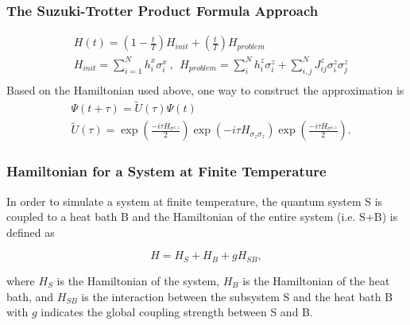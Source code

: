 \documentclass{beamer}
\begin{document}
\begin{frame}
	\frametitle{The Suzuki-Trotter Product Formula Approach}
	\begin{equation*}
		\begin{split}
		&H(t)=(1-\frac{t}{T} )H_{init}+(\frac{t}{T})H_{problem} \\
		&H_{init}= \sum_{i=1}^{N}h_i^x \sigma_i^x ~,~~ H_{problem}= \sum_{i}^N h_i^z \sigma^z_i + \sum_{i,j}^N J_{ij}^z \sigma^z_i \sigma^z_j\\
		\end{split}
	\end{equation*} 
	Based on the Hamiltonian used above, one way to construct the approximation is 
	\begin{equation*}
	\label{tilde_U}
	\begin{split}
	&\Psi(t+\tau) =\tilde{U}(\tau)\Psi(t)\\
	&\tilde{U}(\tau) = \exp(\frac{-i\tau H_{\sigma^{x,z}}}{2})\exp(-i\tau H_{\sigma_z \sigma_z})\exp(\frac{-i\tau H_{\sigma^{x,z}}}{2}).
	\end{split}
	\end{equation*}

\end{frame}
%






\begin{frame}
	\frametitle{Hamiltonian for a System at Finite Temperature}
	In order to simulate a system at finite temperature, the quantum system S is coupled to a heat bath B and the Hamiltonian of the entire system (i.e. S+B) is defined as
	
	\begin{equation*}
	H = H_S + H_B + gH_{SB},
	\end{equation*} 
	
	where $H_S$ is the Hamiltonian of the system, $H_B$ is the Hamiltonian of the heat bath, and $H_{SB}$ is the interaction between the subsystem S and the heat bath B with $g$ indicates the global coupling strength between S and B. 
\end{frame}
\end{document}
